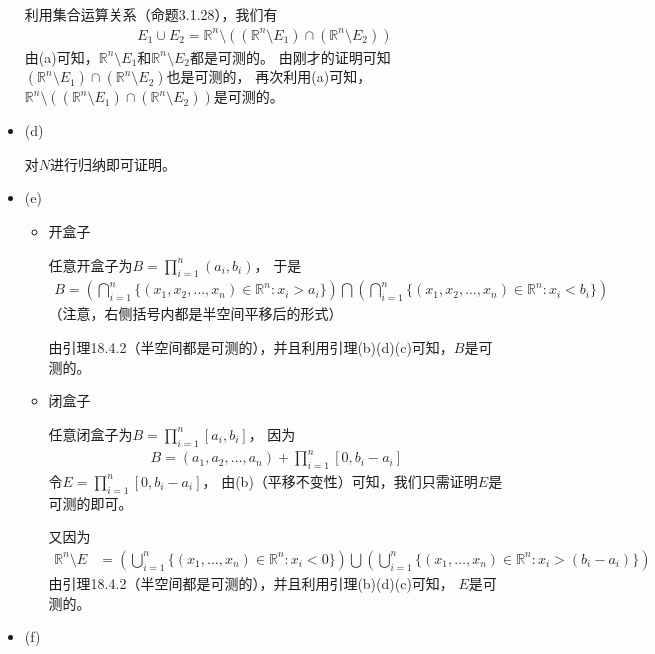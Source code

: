 \documentclass{article}
\begin{document}
\begin{itemize}
        利用集合运算关系（命题3.1.28），我们有
        \begin{align*}
          E_1 \cup E_2 = \mathbb{R}^n \setminus ((\mathbb{R}^n \setminus E_1) \cap (\mathbb{R}^n \setminus E_2))
        \end{align*}
        由(a)可知，$\mathbb{R}^n \setminus E_1$和$\mathbb{R}^n \setminus E_2$都是可测的。
        由刚才的证明可知$(\mathbb{R}^n \setminus E_1) \cap (\mathbb{R}^n \setminus E_2)$也是可测的，
        再次利用(a)可知，$\mathbb{R}^n \setminus ((\mathbb{R}^n \setminus E_1) \cap (\mathbb{R}^n \setminus E_2))$是可测的。

  \item (d)

        对$N$进行归纳即可证明。
  \item (e)

        \begin{itemize}
          \item 开盒子

                任意开盒子为$B = \prod\limits_{i = 1}^n (a_i, b_i)$，
                于是
                \begin{align*}
                  B = \left(\bigcap \limits_{i = 1}^n \{(x_1, x_2, \dots, x_n) \in \mathbb{R}^n : x_i > a_i\}\right)
                  \bigcap
                  \left(\bigcap \limits_{i = 1}^n \{(x_1, x_2, \dots, x_n) \in \mathbb{R}^n : x_i < b_i\}\right)
                \end{align*}
                （注意，右侧括号内都是半空间平移后的形式）

                由引理18.4.2（半空间都是可测的），并且利用引理(b)(d)(c)可知，$B$是可测的。

          \item 闭盒子

                任意闭盒子为$B = \prod\limits_{i = 1}^n [a_i, b_i]$，
                因为
                \begin{align*}
                  B = (a_1, a_2, \dots, a_n) + \prod\limits_{i = 1}^n [0, b_i - a_i]
                \end{align*}
                令$E = \prod\limits_{i = 1}^n [0, b_i - a_i]$，
                由(b)（平移不变性）可知，我们只需证明$E$是可测的即可。

                又因为
                \begin{align*}
                  \mathbb{R}^n \setminus E & = \left(\bigcup \limits_{i = 1}^n \{(x_1, \dots, x_n) \in \mathbb{R}^n : x_i < 0\}\right)
                  \bigcup \left(\bigcup \limits_{i = 1}^n \{(x_1, \dots, x_n) \in \mathbb{R}^n : x_i > (b_i - a_i)\}\right)
                \end{align*}
                由引理18.4.2（半空间都是可测的），并且利用引理(b)(d)(c)可知，
                $E$是可测的。
        \end{itemize}
  \item (f)


\end{itemize}
\end{document}
